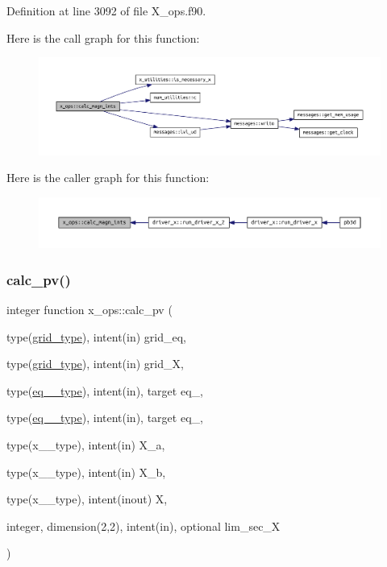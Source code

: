 Definition at line 3092 of file X\+\_\+ops.\+f90.

Here is the call graph for this function\+:\nopagebreak
\begin{figure}[H]
\begin{center}
\leavevmode
\includegraphics[width=350pt]{namespacex__ops_a6df79622d1b95d54ab3e542751a5881d_cgraph}
\end{center}
\end{figure}
Here is the caller graph for this function\+:\nopagebreak
\begin{figure}[H]
\begin{center}
\leavevmode
\includegraphics[width=350pt]{namespacex__ops_a6df79622d1b95d54ab3e542751a5881d_icgraph}
\end{center}
\end{figure}
\mbox{\label{namespacex__ops_a51f3bf0b4c8d688ffbcc3a1adbca9762}} 
\subsubsection{\texorpdfstring{calc\+\_\+pv()}{calc\_pv()}}
{\footnotesize\ttfamily integer function x\+\_\+ops\+::calc\+\_\+pv (\begin{DoxyParamCaption}\item[{type(\hyperlink{structgrid__vars_1_1grid__type}{grid\+\_\+type}), intent(in)}]{grid\+\_\+eq,  }\item[{type(\hyperlink{structgrid__vars_1_1grid__type}{grid\+\_\+type}), intent(in)}]{grid\+\_\+X,  }\item[{type(\hyperlink{structeq__vars_1_1eq__1__type}{eq\+\_\+1\+\_\+type}), intent(in), target}]{eq\+\_,  }\item[{type(\hyperlink{structeq__vars_1_1eq__2__type}{eq\+\_\+2\+\_\+type}), intent(in), target}]{eq\+\_,  }\item[{type(x\+\_\+1\+\_\+type), intent(in)}]{X\+\_\+a,  }\item[{type(x\+\_\+1\+\_\+type), intent(in)}]{X\+\_\+b,  }\item[{type(x\+\_\+2\+\_\+type), intent(inout)}]{X,  }\item[{integer, dimension(2,2), intent(in), optional}]{lim\+\_\+sec\+\_\+X }\end{DoxyParamCaption})}



